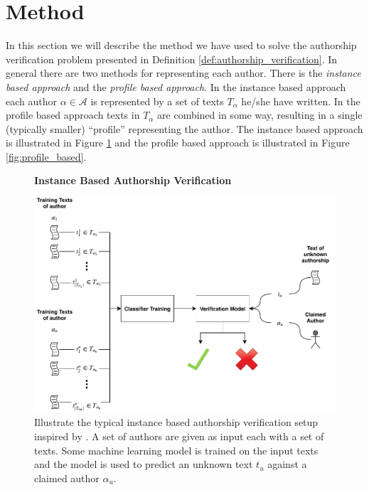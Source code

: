 \section{Method} \label{sec:method}

In this section we will describe the method we have used to solve the authorship
verification problem presented in Definition \ref{def:authorship_verification}.
In general there are two methods for representing each author. There is the
\textit{instance based approach} and the \textit{profile based approach}. In
the instance based approach each author $\alpha \in \mathcal{A}$ is represented
by a set of texts $T_\alpha$ he/she have written. In the profile based approach
texts in $T_\alpha$ are combined in some way, resulting in a single (typically
smaller) ``profile'' representing the author. The instance based approach is
illustrated in Figure \ref{fig:instance_based} and the profile based approach is
illustrated in Figure \ref{fig:profile_based}.

\begin{figure}[htb]
    \centering
    \textbf{Instance Based Authorship Verification}\par\medskip
    \includegraphics[width=\textwidth]{./pictures/method/instance_based}
    \caption{Illustrate the typical instance based authorship verification
    setup inspired by \citet{stamatos2009}. A set of authors are given
    as input each with a set of texts. Some machine learning model is trained on
    the input texts and the model is used to predict an unknown text $t_u$
    against a claimed author $\alpha_u$.}
    \label{fig:instance_based}
\end{figure}

